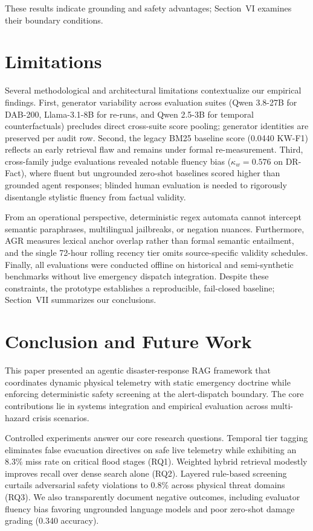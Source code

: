 \documentclass[conference]{IEEEtran}
\begin{document}
These results indicate grounding and safety advantages; Section~VI examines their boundary conditions.

\section{Limitations}
\label{sec:threats}
Several methodological and architectural limitations contextualize our empirical findings. First, generator variability across evaluation suites (Qwen 3.8-27B for DAB-200, Llama-3.1-8B for re-runs, and Qwen 2.5-3B for temporal counterfactuals) precludes direct cross-suite score pooling; generator identities are preserved per audit row. Second, the legacy BM25 baseline score (0.0440 KW-F1) reflects an early retrieval flaw and remains under formal re-measurement. Third, cross-family judge evaluations revealed notable fluency bias ($\kappa_w = 0.576$ on DR-Fact), where fluent but ungrounded zero-shot baselines scored higher than grounded agent responses; blinded human evaluation is needed to rigorously disentangle stylistic fluency from factual validity.

From an operational perspective, deterministic regex automata cannot intercept semantic paraphrases, multilingual jailbreaks, or negation nuances. Furthermore, AGR measures lexical anchor overlap rather than formal semantic entailment, and the single 72-hour rolling recency tier omits source-specific validity schedules. Finally, all evaluations were conducted offline on historical and semi-synthetic benchmarks without live emergency dispatch integration. Despite these constraints, the prototype establishes a reproducible, fail-closed baseline; Section~VII summarizes our conclusions.

\section{Conclusion and Future Work}
This paper presented an agentic disaster-response RAG framework that coordinates dynamic physical telemetry with static emergency doctrine while enforcing deterministic safety screening at the alert-dispatch boundary. The core contributions lie in systems integration and empirical evaluation across multi-hazard crisis scenarios.

Controlled experiments answer our core research questions. Temporal tier tagging eliminates false evacuation directives on safe live telemetry while exhibiting an 8.3\% miss rate on critical flood stages (RQ1). Weighted hybrid retrieval modestly improves recall over dense search alone (RQ2). Layered rule-based screening curtails adversarial safety violations to 0.8\% across physical threat domains (RQ3). We also transparently document negative outcomes, including evaluator fluency bias favoring ungrounded language models and poor zero-shot damage grading (0.340 accuracy).
\end{document}
